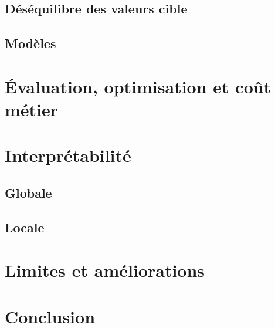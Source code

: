 \documentclass[12pt, a4paper]{article}
\begin{document}
\subsection{Déséquilibre des valeurs cible}



\subsection{Modèles}



\section{Évaluation, optimisation et coût métier}



\section{Interprétabilité}



\subsection{Globale}



\subsection{Locale}



\section{Limites et améliorations}



\section{Conclusion}
\end{document}
